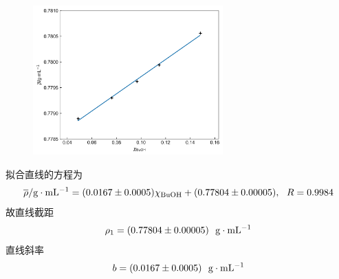 \documentclass[12pt]{article}
\begin{document}
\begin{figure}[h]
	\centering
	\includegraphics[width=0.65\textwidth]{2.jpg}
\end{figure}
\par

拟合直线的方程为
$$
\overline{\rho}/{\rm g\cdot mL^{-1}}=(0.0167\pm 0.0005)\chi_{\rm BuOH}+(0.77804\pm 0.00005),\  \ R=0.9984
$$
故直线截距
$$\rho_{1}=(0.77804\pm 0.00005)\ \ {\rm g\cdot mL^{-1}}$$
直线斜率
$$b=(0.0167\pm 0.0005)\ \ {\rm g\cdot mL^{-1}}$$
\end{document}
